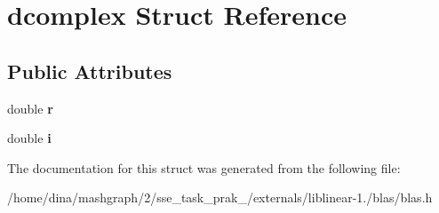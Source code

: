 \hypertarget{structdcomplex}{\section{dcomplex Struct Reference}
\label{structdcomplex}
}
\subsection*{Public Attributes}
\begin{DoxyCompactItemize}
\item 
\hypertarget{structdcomplex_a13cf90b032d440cd0806a3604a5c629c}{double {\bfseries r}}\label{structdcomplex_a13cf90b032d440cd0806a3604a5c629c}

\item 
\hypertarget{structdcomplex_a7bf15edc208cfd6f61cef033b256350f}{double {\bfseries i}}\label{structdcomplex_a7bf15edc208cfd6f61cef033b256350f}

\end{DoxyCompactItemize}


The documentation for this struct was generated from the following file\-:\begin{DoxyCompactItemize}
\item 
/home/dina/mashgraph/2/sse\-\_\-task\-\_\-prak\-\_/externals/liblinear-\/1./blas/blas.\-h\end{DoxyCompactItemize}

